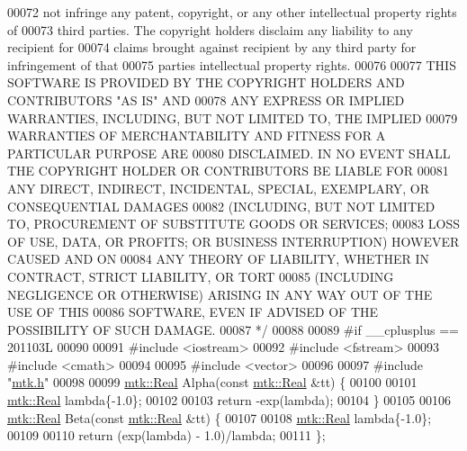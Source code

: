 \begin{DoxyCode}
00072 \textcolor{comment}{not infringe any patent, copyright, or any other intellectual property rights of}
00073 \textcolor{comment}{third parties. The copyright holders disclaim any liability to any recipient for}
00074 \textcolor{comment}{claims brought against recipient by any third party for infringement of that}
00075 \textcolor{comment}{parties intellectual property rights.}
00076 \textcolor{comment}{}
00077 \textcolor{comment}{THIS SOFTWARE IS PROVIDED BY THE COPYRIGHT HOLDERS AND CONTRIBUTORS "AS IS" AND}
00078 \textcolor{comment}{ANY EXPRESS OR IMPLIED WARRANTIES, INCLUDING, BUT NOT LIMITED TO, THE IMPLIED}
00079 \textcolor{comment}{WARRANTIES OF MERCHANTABILITY AND FITNESS FOR A PARTICULAR PURPOSE ARE}
00080 \textcolor{comment}{DISCLAIMED. IN NO EVENT SHALL THE COPYRIGHT HOLDER OR CONTRIBUTORS BE LIABLE FOR}
00081 \textcolor{comment}{ANY DIRECT, INDIRECT, INCIDENTAL, SPECIAL, EXEMPLARY, OR CONSEQUENTIAL DAMAGES}
00082 \textcolor{comment}{(INCLUDING, BUT NOT LIMITED TO, PROCUREMENT OF SUBSTITUTE GOODS OR SERVICES;}
00083 \textcolor{comment}{LOSS OF USE, DATA, OR PROFITS; OR BUSINESS INTERRUPTION) HOWEVER CAUSED AND ON}
00084 \textcolor{comment}{ANY THEORY OF LIABILITY, WHETHER IN CONTRACT, STRICT LIABILITY, OR TORT}
00085 \textcolor{comment}{(INCLUDING NEGLIGENCE OR OTHERWISE) ARISING IN ANY WAY OUT OF THE USE OF THIS}
00086 \textcolor{comment}{SOFTWARE, EVEN IF ADVISED OF THE POSSIBILITY OF SUCH DAMAGE.}
00087 \textcolor{comment}{*/}
00088 
00089 \textcolor{preprocessor}{#if \_\_cplusplus == 201103L}
00090 
00091 \textcolor{preprocessor}{#include <iostream>}
00092 \textcolor{preprocessor}{#include <fstream>}
00093 \textcolor{preprocessor}{#include <cmath>}
00094 
00095 \textcolor{preprocessor}{#include <vector>}
00096 
00097 \textcolor{preprocessor}{#include "\hyperlink{mtk_8h}{mtk.h}"}
00098 
00099 \hyperlink{group__c01-roots_gac080bbbf5cbb5502c9f00405f894857d}{mtk::Real} Alpha(\textcolor{keyword}{const} \hyperlink{group__c01-roots_gac080bbbf5cbb5502c9f00405f894857d}{mtk::Real} &tt) \{
00100 
00101   \hyperlink{group__c01-roots_gac080bbbf5cbb5502c9f00405f894857d}{mtk::Real} lambda\{-1.0\};
00102 
00103   \textcolor{keywordflow}{return} -exp(lambda);
00104 \}
00105 
00106 \hyperlink{group__c01-roots_gac080bbbf5cbb5502c9f00405f894857d}{mtk::Real} Beta(\textcolor{keyword}{const} \hyperlink{group__c01-roots_gac080bbbf5cbb5502c9f00405f894857d}{mtk::Real} &tt) \{
00107 
00108   \hyperlink{group__c01-roots_gac080bbbf5cbb5502c9f00405f894857d}{mtk::Real} lambda\{-1.0\};
00109 
00110   \textcolor{keywordflow}{return} (exp(lambda) - 1.0)/lambda;
00111 \};

\end{DoxyCode}
